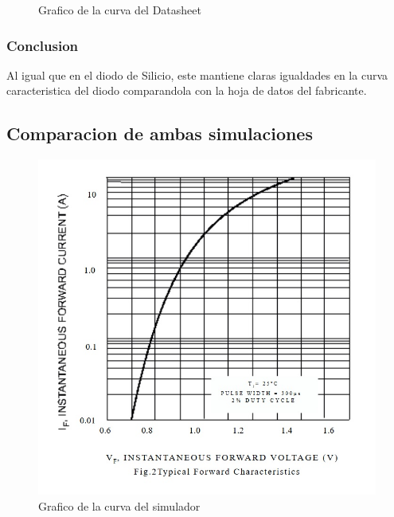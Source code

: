 \documentclass[chaptersright]{informeutn}
\begin{document}
\begin{figure}[!h]
\begin{minipage}[b]{0.4\textwidth}
              \caption{Grafico de la curva del Datasheet}
            \end{minipage}
          \end{figure}

        \subsubsection{Conclusion}
          Al igual que en el diodo de Silicio, este mantiene claras igualdades en la curva caracteristica del diodo
          comparandola con la hoja de datos del fabricante.

        \subsection{Comparacion de ambas simulaciones}

          \begin{figure}[!h]
            \centering
            \begin{minipage}[b]{0.4\textwidth}
              \includegraphics[width=1.1\linewidth]{pictures/Curva_Datash_Si.jpg}
              \caption{Grafico de la curva del simulador}
            \end{minipage}
          \end{figure}
\end{document}
